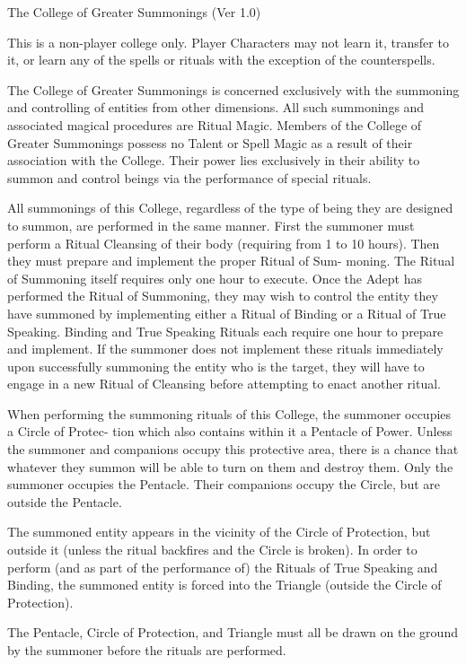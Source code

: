 \begin{Chapter}{The College of Greater Summonings (Ver 1.0)}

This is a non-player college only.  Player Characters may not learn
it, transfer to it, or learn any of the spells or rituals with the
exception of the counterspells.

The College of Greater Summonings is concerned exclusively with the
summoning and controlling of entities from other dimensions.  All such
summonings and associated magical procedures are Ritual Magic.
Members of the College of Greater Summonings possess no Talent or
Spell Magic as a result of their association with the College.  Their
power lies exclusively in their ability to summon and control beings
via the performance of special rituals.

All summonings of this College, regardless of the type of being they
are designed to summon, are performed in the same manner. First the
summoner must perform a Ritual Cleansing of their body (requiring from
1 to 10 hours).  Then they must prepare and implement the proper
Ritual of Sum- moning.  The Ritual of Summoning itself requires only
one hour to execute.  Once the Adept has performed the Ritual of
Summoning, they may wish to control the entity they have summoned by
implementing either a Ritual of Binding or a Ritual of True Speaking.
Binding and True Speaking Rituals each require one hour to prepare and
implement.  If the summoner does not implement these rituals
immediately upon successfully summoning the entity who is the target,
they will have to engage in a new Ritual of Cleansing before
attempting to enact another ritual.

When performing the summoning rituals of this College, the summoner
occupies a Circle of Protec- tion which also contains within it a
Pentacle of Power.  Unless the summoner and companions occupy this
protective area, there is a chance that whatever they summon will be
able to turn on them and destroy them. Only the summoner occupies the
Pentacle. Their companions occupy the Circle, but are outside the
Pentacle.

The summoned entity appears in the vicinity of the Circle of
Protection, but outside it (unless the ritual backfires and the Circle
is broken).  In order to perform (and as part of the performance of)
the Rituals of True Speaking and Binding, the summoned entity is
forced into the Triangle (outside the Circle of Protection).

The Pentacle, Circle of Protection, and Triangle must all be drawn on
the ground by the summoner before the rituals are performed.


\end{Chapter}
